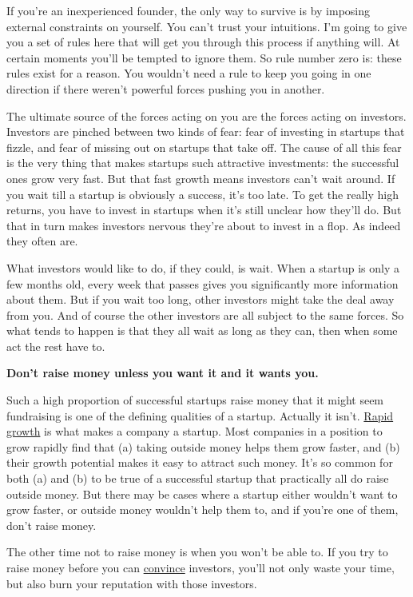 \documentclass[12pt]{book}
\begin{document}
If you're an inexperienced founder, the only way to survive is by
imposing external constraints on yourself. You can't trust your
intuitions. I'm going to give you a set of rules here that will get you
through this process if anything will. At certain moments you'll be
tempted to ignore them. So rule number zero is: these rules exist for a
reason. You wouldn't need a rule to keep you going in one direction if
there weren't powerful forces pushing you in another.

The ultimate source of the forces acting on you are the forces acting on
investors. Investors are pinched between two kinds of fear: fear of
investing in startups that fizzle, and fear of missing out on startups
that take off. The cause of all this fear is the very thing that makes
startups such attractive investments: the successful ones grow very
fast. But that fast growth means investors can't wait around. If you
wait till a startup is obviously a success, it's too late. To get the
really high returns, you have to invest in startups when it's still
unclear how they'll do. But that in turn makes investors nervous they're
about to invest in a flop. As indeed they often are.

What investors would like to do, if they could, is wait. When a startup
is only a few months old, every week that passes gives you significantly
more information about them. But if you wait too long, other investors
might take the deal away from you. And of course the other investors are
all subject to the same forces. So what tends to happen is that they all
wait as long as they can, then when some act the rest have to.

\textbf{Don't raise money unless you want it and it wants you.}

Such a high proportion of successful startups raise money that it might
seem fundraising is one of the defining qualities of a startup. Actually
it isn't. \href{growth.html}{Rapid growth} is what makes a company a
startup. Most companies in a position to grow rapidly find that (a)
taking outside money helps them grow faster, and (b) their growth
potential makes it easy to attract such money. It's so common for both
(a) and (b) to be true of a successful startup that practically all do
raise outside money. But there may be cases where a startup either
wouldn't want to grow faster, or outside money wouldn't help them to,
and if you're one of them, don't raise money.

The other time not to raise money is when you won't be able to. If you
try to raise money before you can \href{convince.html}{convince}
investors, you'll not only waste your time, but also burn your
reputation with those investors.
\end{document}
